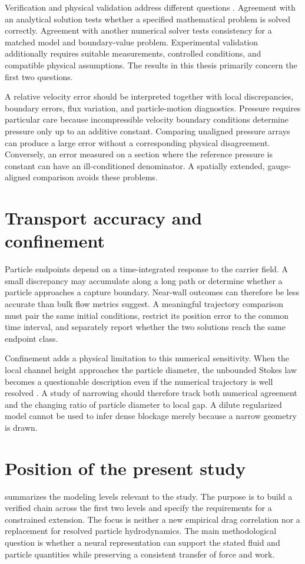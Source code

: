 Verification and physical validation address different questions
\citep{roache1998,oberkampf2002}. Agreement with an analytical solution %
 tests whether a
specified mathematical problem is solved correctly. Agreement with another
numerical solver tests consistency for a matched model and boundary-value
problem. Experimental validation additionally requires suitable
measurements, controlled conditions, and compatible physical assumptions.
The results in this thesis primarily concern the first two questions.

A relative velocity error should be interpreted together with local
discrepancies, boundary errors, flux variation, and particle-motion
diagnostics. Pressure requires particular care because incompressible
velocity boundary conditions determine pressure only up to an additive
constant. Comparing unaligned pressure arrays can produce a large error
without a corresponding physical disagreement. Conversely, an error
measured on a section where the reference pressure is constant can have an
ill-conditioned denominator. A spatially extended, gauge-aligned comparison
avoids these problems.

\section{Transport accuracy and confinement}
Particle endpoints depend on a time-integrated response to the carrier
field. A small discrepancy may accumulate along a long path or determine
whether a particle approaches a capture boundary. Near-wall outcomes can
therefore be less accurate than bulk flow metrics suggest. A meaningful
trajectory comparison must pair the same initial conditions, restrict its
position error to the common time interval, and separately report whether
the two solutions reach the same endpoint class.

Confinement adds a physical limitation to this numerical sensitivity. When
the local channel height approaches the particle diameter, the unbounded
Stokes law becomes a questionable description even if the numerical
trajectory is well resolved \citep{goldman1967,brenner1961}. %
 A study of narrowing should therefore track
both numerical agreement and the changing ratio of particle diameter to
local gap. A dilute regularized model cannot be used to infer dense
blockage merely because a narrow geometry is drawn.

\section{Position of the present study}
 summarizes the modeling levels relevant to the
study. The purpose is to build a verified chain across the first two levels
and specify the requirements for a constrained extension. The focus is
neither a new empirical drag correlation nor a replacement for resolved
particle hydrodynamics. The main methodological question is whether a
neural representation can support the stated fluid and particle quantities
while preserving a consistent transfer of force and work.

